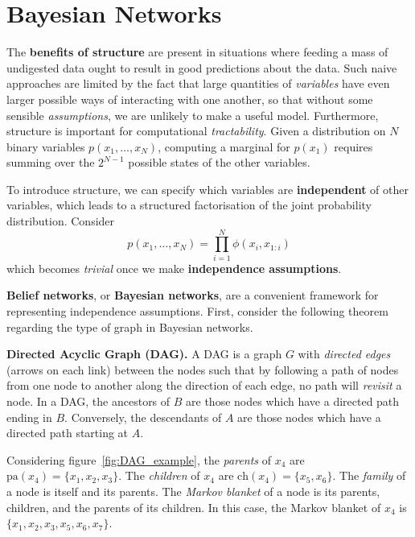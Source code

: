 \documentclass{article}
\begin{document}
\newpage
\section{Bayesian Networks}

The \textbf{benefits of structure} are present in situations where feeding a mass of undigested data ought to result in good predictions about the data. Such naive approaches are limited by the fact that large quantities of \textit{variables} have even larger possible ways of interacting with one another, so that without some sensible \textit{assumptions}, we are unlikely to make a useful model. Furthermore, structure is important for computational \textit{tractability}. Given a distribution on $N$ binary variables $p(x_1,\dots,x_N)$, computing a marginal for $p(x_1)$ requires summing over the $2^{N-1}$ possible states of the other variables. 

To introduce structure, we can specify which variables are \textbf{independent} of other variables, which leads to a structured factorisation of the joint probability distribution. Consider
$$
    p(x_1, \dots, x_N) = \prod_{i = 1}^{N} \phi(x_i, x_{1:i})
$$
which becomes \textit{trivial} once we make \textbf{independence assumptions}. 

\textbf{Belief networks}, or \textbf{Bayesian networks}, are a convenient framework for representing independence assumptions. First, consider the following theorem regarding the type of graph in Bayesian networks.  
\\
\begin{theorem}
    \textbf{Directed Acyclic Graph (DAG).} A DAG is a graph $G$ with \textit{directed edges} (arrows on each link) between the nodes such that by following a path of nodes from one node to another along the direction of each edge, no path will \textit{revisit} a node. In a DAG, the ancestors of $B$ are those nodes which have a directed path ending in $B$. Conversely, the descendants of $A$ are those nodes which have a directed path starting at $A$.
\end{theorem}

\noindent Considering figure~\ref{fig:DAG_example}, the \textit{parents} of $x_4$ are $\text{pa}(x_4) = \{ x_1, x_2, x_3\}$. The \textit{children} of $x_4$ are $\text{ch}(x_4) = \{x_5, x_6\}$. The \textit{family} of a node is itself and its parents. The \textit{Markov blanket} of a node is its parents, children, and the parents of its children. In this case, the Markov blanket of $x_4$ is $\{ x_1, x_2, x_3, x_5, x_6, x_7\}$.
\end{document}

